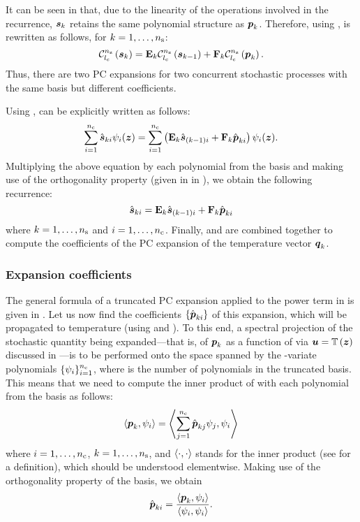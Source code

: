 It can be seen in  that, due to the linearity of the operations
involved in the recurrence, $\boldsymbol{s}_k$ retains the same polynomial structure as
$\boldsymbol{p}_k$. Therefore, using ,  is rewritten as
follows, for $k = 1, \dots, {n_\mathrm{s}}$:
\begin{equation} \elab{expanded-recurrence}
  \chaos{\nz}{\lc}{\vs_k} = \m{E}_k \chaos{\nz}{\lc}{\vs_{k - 1}} + \m{F}_k
  \chaos{\nz}{\lc}{\vp_k}.
\end{equation}
Thus, there are two PC expansions for two concurrent stochastic processes with
the same basis but different coefficients.

Using ,  can be explicitly written
as follows:
\[
  \sum_{i = 1}^{{n_\mathrm{c}}} \hat{\boldsymbol{s}}_{ki} \psi_i(\boldsymbol{z}) = \sum_{i = 1}^{{n_\mathrm{c}}} \left( \mathbf{E}_k \hat{\boldsymbol{s}}_{(k - 1)i} + \mathbf{F}_k \hat{\boldsymbol{p}}_{ki} \right) \psi_i(\boldsymbol{z}).
\]
Multiplying the above equation by each polynomial from the basis and making use
of the orthogonality property (given in  in
), we obtain the following recurrence:
\begin{equation} \elab{pc-recurrence}
  \hat{\vs}_{ki} = \m{E}_k \hat{\vs}_{(k - 1)i} + \m{F}_k \hat{\vp}_{ki}
\end{equation}
where $k = 1, \dots, {n_\mathrm{s}}$ and $i = 1, \dots, {n_\mathrm{c}}$. Finally,
 and  are combined together to compute
the coefficients of the PC expansion of the temperature vector $\boldsymbol{q}_k$.

\subsubsection{Expansion coefficients}

The general formula of a truncated PC expansion applied to the power term in
 is given in . Let us now find the
coefficients $\{ \hat{\boldsymbol{p}}_{ki} \}$ of this expansion, which will be propagated
to temperature (using  and ). To this
end, a spectral projection of the stochastic quantity being expanded---that is,
of $\boldsymbol{p}_k$ as a function of \vz via $\boldsymbol{u} = \mathbb{T}\left(\boldsymbol{z}\right)$ discussed in
---is to be performed onto the space spanned by the
\nz-variate polynomials $\{ \psi_i \}_{i = 1}^{{n_\mathrm{c}}}$, where \nc is the number of
polynomials in the truncated basis. This means that we need to compute the inner
product of  with each polynomial from the basis as follows:
\[
  \left\langle \boldsymbol{p}_k, \psi_i \right\rangle = \left\langle \sum_{j = 1}^{{n_\mathrm{c}}} \hat{\boldsymbol{p}}_{kj} \psi_j, \psi_i \right\rangle
\]
where $i = 1, \dots, {n_\mathrm{c}}$, $k = 1, \dots, {n_\mathrm{s}}$, and
$\left\langle \cdot, \cdot \right\rangle$ stands for the inner product (see
 for a definition), which should be understood
elementwise. Making use of the orthogonality property of the basis, we obtain
\begin{equation} \elab{pc-coefficients}
  \hat{\vp}_{ki} = \frac{\innerproduct{\vp_k}{\psi_i}}{\innerproduct{\psi_i}{\psi_i}}.
\end{equation}

